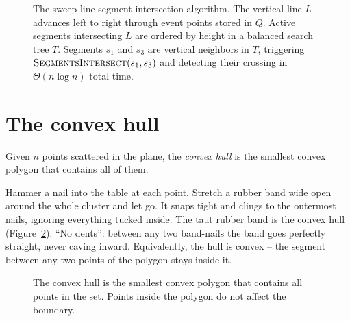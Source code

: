 \begin{figure}[H]
\caption{The sweep-line segment intersection algorithm. The vertical line
$L$ advances left to right through event points stored in $Q$. Active segments
intersecting $L$ are ordered by height in a balanced search tree $T$. Segments
$s_1$ and $s_3$ are vertical neighbors in $T$, triggering
$\textsc{SegmentsIntersect}(s_1,s_3)$ and detecting their crossing in
$\Theta(n \log n)$ total time.}
\label{ch32:fig-sweepline}
\end{figure}

\section{The convex hull}

Given $n$ points scattered in the plane, the
\emph{convex hull} is the smallest convex polygon that contains all of them.

\begin{intuitionbox}
Hammer a nail into the table at each point. Stretch a rubber band wide open around
the whole cluster and let go. It snaps tight and clings to the outermost nails,
ignoring everything tucked inside. The taut rubber band is the convex hull (Figure~\ref{ch32:fig-hull}). ``No
dents'': between any two band-nails the band goes perfectly straight, never caving
inward. Equivalently, the hull is convex -- the segment between any two points of
the polygon stays inside it.
\end{intuitionbox}

\begin{figure}[htbp]
\centering
{}
\caption{The convex hull is the smallest convex polygon that contains all points in the set. Points inside the polygon do not affect the boundary.}
\label{ch32:fig-hull}
\end{figure}

